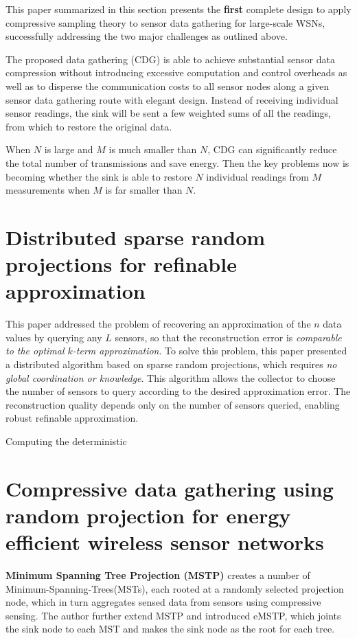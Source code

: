 This paper summarized in this section presents the \textbf{\textcolor[rgb]{1,0,0}{first}} complete design to apply compressive sampling theory to sensor data gathering for large-scale WSNs, successfully addressing the two major challenges as outlined above. 

The proposed data gathering (CDG) is able to achieve substantial sensor data compression without introducing excessive computation and control overheads as well as to disperse the communication costs to all sensor nodes along a given sensor data gathering route with elegant design. Instead of receiving individual sensor readings, the sink will be sent a few weighted sums of all the readings, from which to restore the original data. 

When $N$ is large and $M$ is much smaller than $N$, CDG can significantly reduce the total number of transmissions and save energy. Then the key problems now is becoming whether the sink is able to restore $N$ individual readings from $M$ measurements when $M$ is far smaller than $N$. 

\section{Distributed sparse random projections for refinable approximation}
\label{sec1.4}
This paper addressed the problem of recovering an approximation of the $n$ data values by querying any $L$ sensors, so that the reconstruction error is \emph{\textcolor[rgb]{1,0,0}{comparable to the optimal $k$-term approximation}}. To solve this problem, this paper presented a distributed algorithm based on sparse random projections, which requires \emph{\textcolor[rgb]{1,0,0}{no global coordination or knowledge}}. This algorithm allows the collector to choose the number of sensors to query according to the desired approximation error. The reconstruction quality depends only on the number of sensors queried, enabling robust refinable approximation. 

Computing the deterministic 

\section{Compressive data gathering using random projection for energy efficient wireless sensor networks}
\label{sec1.5}
\textbf{\textcolor[rgb]{1,0,0}{Minimum Spanning Tree Projection (MSTP)}} creates a number of Minimum-Spanning-Trees(MSTs), each rooted at a randomly selected projection node, which in turn aggregates sensed data from sensors using compressive sensing. The author further extend MSTP and introduced eMSTP, which joints the sink node to each MST and makes the sink node as the root for each tree.

